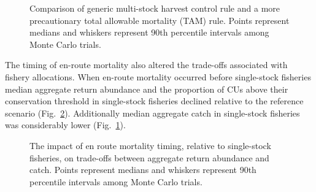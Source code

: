 \documentclass[11pt]{book}
\begin{document}
\begin{figure}[htb]

{\centering {} 

}

\caption{Comparison of generic multi-stock harvest control rule and a more precautionary total allowable mortality (TAM) rule. Points represent medians and whiskers represent 90th percentile intervals among Monte Carlo trials.}\label{fig:hcrTO}
\end{figure}
The timing of en-route mortality also altered the trade-offs associated with fishery allocations. When en-route mortality occurred before single-stock fisheries median aggregate return abundance and the proportion of CUs above their conservation threshold in single-stock fisheries declined relative to the reference scenario (Fig.~\ref{fig:erTO}). Additionally median aggregate catch in single-stock fisheries was considerably lower (Fig.~\ref{fig:hcrTO}).
\begin{figure}[htb]

{\centering {} 

}

\caption{The impact of en route mortality timing, relative to single-stock fisheries, on trade-offs between aggregate return abundance and catch. Points represent medians and whiskers represent 90th percentile intervals among Monte Carlo trials.}\label{fig:erTO}
\end{figure}
\end{document}
